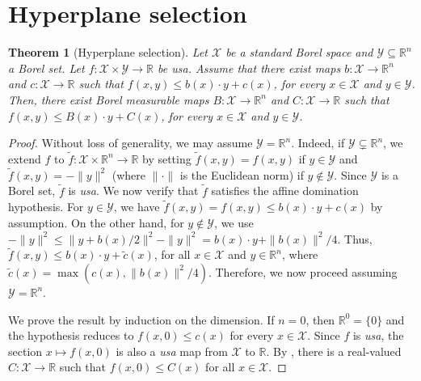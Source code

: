 \documentclass[10pt, a4paper]{article}
\newcommand{\R}{\mathbb R}
\newcommand{\usa}{\emph{usa}\xspace}
\newcommand{\X}{\mathcal X}
\newcommand{\Y}{\mathcal Y}
\newtheorem{theorem}{Theorem}
\begin{document}
\section{Hyperplane selection}
\begin{theorem}[Hyperplane selection]\label{thm:main}
    Let $\X$ be a standard Borel space and $\Y\subseteq\R^n$ a Borel set. Let $f:\X\times \Y\to\R$ be \usa. Assume that there exist maps $b:\X\to\R^n$ and $c:\X\to\R$ such that $f(x,y)\leq b(x)\cdot y  +c(x)$, for every $x\in\X$ and $y\in \Y$. Then, there exist Borel measurable maps $B:\X\to\R^n$ and $C:\X\to\R$ such that
    $f(x,y)\leq B(x)\cdot y  +C(x)$, for every $x\in\X$ and $y\in\Y$.
\end{theorem}
\begin{proof}
    Without loss of generality, we may assume $\Y = \mathbb R^n$. Indeed, if $\Y \subsetneq \mathbb R^n$, we extend $f$ to $\tilde{f}: \X \times \mathbb R^n \to \R$ by setting $\tilde{f}(x,y) = f(x,y)$ if $y \in \Y$ and $\tilde{f}(x,y) = -\|y\|^2$ (where $\|\cdot\|$ is the Euclidean norm) if $y \notin \Y$. Since $\Y$ is a Borel set, $\tilde{f}$ is \usa. We now verify that $\tilde{f}$ satisfies the affine domination hypothesis. For $y \in \Y$, we have $\tilde{f}(x,y) = f(x,y) \leq b(x)\cdot y + c(x)$ by assumption. On the other hand, for $y \notin \Y$, we use $-\|y\|^2 \leq \|y + b(x)/2\|^2 - \|y\|^2 =  b(x)\cdot y + \|b(x)\|^2/4$. Thus, $\tilde{f}(x,y) \le b(x)\cdot y + \tilde{c}(x)$, for all $x\in\X$ and $y\in\R^n$, where $\tilde{c}(x) = \max(c(x), \|b(x)\|^2/4)$. Therefore, we now proceed assuming $\Y = \mathbb R^n$.

    We prove the result by induction on the dimension. If $n=0$, then $\R^0 = \{0\}$ and the hypothesis  reduces to $f(x,0)\leq c(x)$ for every $x\in\X$. Since $f$ is \usa, the section $x\mapsto f(x,0)$ is also a \usa map from $\X$ to $\R$. By , there is a real-valued $C:\X\to\R$ such that  $f(x,0)\leq C(x)$ for all $x\in\X$. 


\end{proof}
\end{document}

